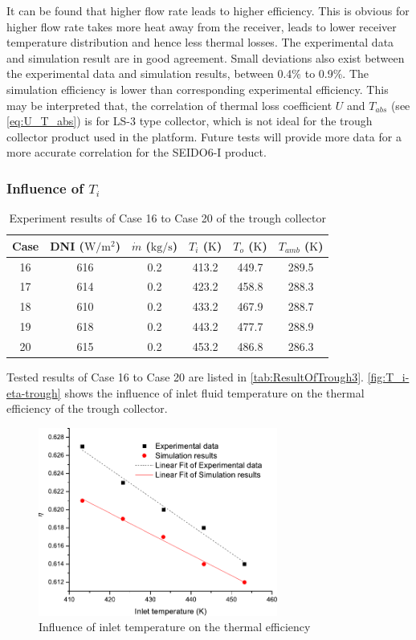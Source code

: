 It can be found that higher flow rate leads to higher efficiency. This is obvious for higher flow rate takes more heat away from the receiver, leads to lower receiver temperature distribution and hence less thermal losses. The experimental data and simulation result are in good agreement. Small deviations also exist between the experimental data and simulation results, between 0.4\% to 0.9\%. The simulation efficiency is lower than corresponding experimental efficiency. This may be interpreted that, the correlation of thermal loss coefficient $U$ and $T_{abs}$ (see \autoref{eq:U_T_abs}) is for LS-3 type collector, which is not ideal for the trough collector product used in the platform. Future tests will provide more data for a more accurate correlation for the SEIDO6-I product.

\subsubsection{Influence of $T_i$}

\begin{table}[htbp]
	\caption{Experiment results of Case 16 to Case 20 of the trough collector}
	\centering
	\begin{tabular}{cccccc}
		\toprule
		Case	& DNI ($\mathrm{W/m^2}$)	&	$\dot{m}$ ($\mathrm{kg/s}$)			&	$T_i$ ($\mathrm{K}$)	&	$T_o$ ($\mathrm{K}$)		&	$T_{amb}$ ($\mathrm{K}$)\\
		\midrule
		16	&	616	&	0.2	&	413.2	&	449.7	&	289.5\\
		17	&	614	&	0.2	&	423.2	&	458.8	&	288.3\\
		18	&	610	&	0.2	&	433.2	&	467.9	&	288.7	\\
		19	&	618	&	0.2	&	443.2	&	477.7	&	288.9\\
		20	&	615	&	0.2	&	453.2	&	486.8	&	286.3\\
		\bottomrule
	\end{tabular}
	
	\label{tab:ResultOfTrough3}
\end{table}
Tested results of Case 16 to Case 20 are listed in \autoref{tab:ResultOfTrough3}.
\autoref{fig:T_i-eta-trough} shows the influence of inlet fluid temperature on the thermal efficiency of the trough collector.
\begin{figure}[!ht]
\centering
\includegraphics[width=0.7\textwidth]{fig/T_i-eta-trough}
\caption{Influence of inlet temperature on the thermal efficiency}
\label{fig:T_i-eta-trough}
\end{figure}

